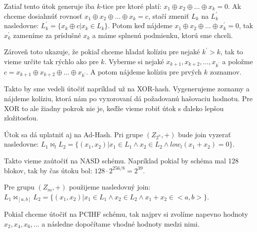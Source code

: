 Zatiaľ tento útok generuje iba $k$-tice pre ktoré platí: $x_1 \oplus x_2 \oplus \dots \oplus x_k = 0$. 
Ak chceme dosiahnúť rovnosť $x_1 \oplus x_2 \oplus \dots \oplus x_k = c$, stačí zmeniť $L_k$ na $L_k^{'}$
nasledovne: $L_k^{'} = \{x_k \oplus c | x_k \in L_k\}$. Potom keď nájdeme $x_1 \oplus x_2 \oplus \dots \oplus x_k^{'} = 0$,
tak $x_k^{'}$ zameníme za príslušné $x_k$ a máme splnenú podmienku, ktorú sme chceli.

Zároveň toto ukazuje, že pokiaľ chceme hľadať kolíziu pre nejaké $k^{'} > k$, tak to vieme
určite tak rýchlo ako pre $k$. Vyberme si nejaké $x_{k+1}, x_{k+2}, \dots, x_{k^{'}}$ a položme
$c = x_{k+1} \oplus x_{k+2} \oplus \dots \oplus x_{k^{'}}$. A potom nájdeme kolíziu pre prvých $k$ zoznamov. 

Takto by sme vedeli útočiť napríklad už na XOR-hash. Vygenerujeme zoznamy a nájdeme kolíziu, ktorá nám po
vyxorovaní dá požadovanú hašovaciu hodnotu. Pre XOR to ale žiadny pokrok nie je, keďže vieme robiť
útok s ďaleko lepšou zložitosťou.

Útok sa dá uplatniť aj na Ad-Hash.
Pri grupe $(Z_{2^n}, +)$ bude join vyzerať nasledovne: $L_1 \bowtie_l L_2 = \{(x_1, x_2) | x_1 \in L_1 \land x_2 \in L_2 \land low_l(x_1 + x_2) = 0\}$.

Takto vieme zaútočiť na NASD schému. Napríklad pokiaľ by schéma mal 128 blokov, tak by čas útoku bol: $128 \cdot 2^{256/8} = 2^{39}$.

Pre grupu $(Z_m, +)$ použijeme nasledovný join: $L_1 \bowtie_{[a,b]} L_2 = \{(x_1, x_2) | x_1 \in L_1 \land x_2 \in L_2 \land x_1 + x_2 \in <a,b>\}$.


Pokiaľ chceme útočiť na PCIHF schému, tak najprv si zvolíme napevno hodnoty $x_2, x_4, x_6, \dots$ a následne dopočítame vhodné hodnoty medzi nimi.

